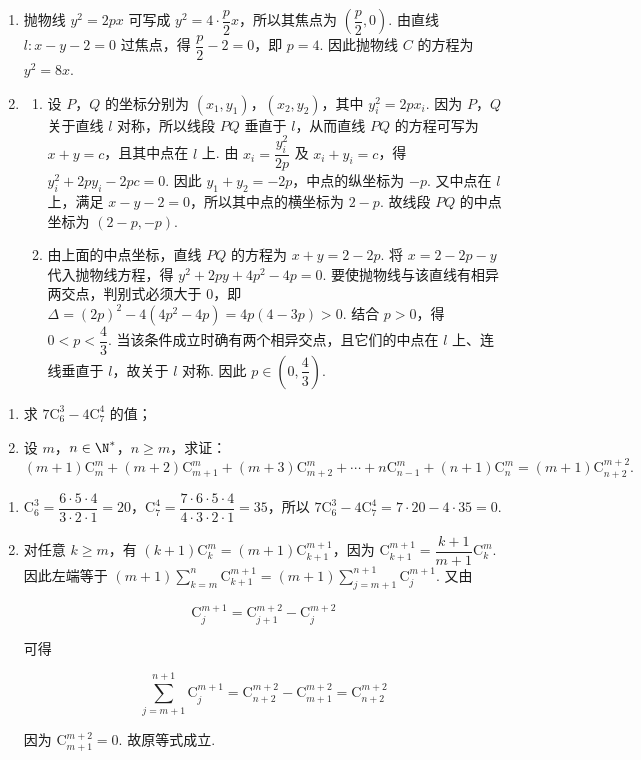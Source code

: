 \begin{solution}
\begin{enumerate}
\item 抛物线 \(y^2=2px\) 可写成 \(y^2=4\cdot\dfrac p2x\)，所以其焦点为 \(\left(\dfrac p2,0\right)\). 由直线 \(l:x-y-2=0\) 过焦点，得 \(\dfrac p2-2=0\)，即 \(p=4\). 因此抛物线 \(C\) 的方程为 \(y^2=8x\).
\item
\begin{enumerate}
\item 设 \(P\)，\(Q\) 的坐标分别为 \((x_1,y_1)\)，\((x_2,y_2)\)，其中 \(y_i^2=2px_i\). 因为 \(P\)，\(Q\) 关于直线 \(l\) 对称，所以线段 \(PQ\) 垂直于 \(l\)，从而直线 \(PQ\) 的方程可写为 \(x+y=c\)，且其中点在 \(l\) 上. 由 \(x_i=\dfrac{y_i^2}{2p}\) 及 \(x_i+y_i=c\)，得 \(y_i^2+2py_i-2pc=0\). 因此 \(y_1+y_2=-2p\)，中点的纵坐标为 \(-p\). 又中点在 \(l\) 上，满足 \(x-y-2=0\)，所以其中点的横坐标为 \(2-p\). 故线段 \(PQ\) 的中点坐标为 \((2-p,-p)\).
\item 由上面的中点坐标，直线 \(PQ\) 的方程为 \(x+y=2-2p\). 将 \(x=2-2p-y\) 代入抛物线方程，得 \(y^2+2py+4p^2-4p=0\). 要使抛物线与该直线有相异两交点，判别式必须大于 \(0\)，即 \(\Delta=(2p)^2-4(4p^2-4p)=4p(4-3p)>0\). 结合 \(p>0\)，得 \(0<p<\dfrac43\). 当该条件成立时确有两个相异交点，且它们的中点在 \(l\) 上、连线垂直于 \(l\)，故关于 \(l\) 对称. 因此 \(p\in\left(0,\dfrac43\right)\).
\end{enumerate}
\end{enumerate}
\end{solution}

\begin{problem}
\begin{enumerate}
\item 求 \(7\mathrm C_6^3-4\mathrm C_7^4\) 的值；
\item 设 \(m\)，\(n\in\N^*\)，\(n\ge m\)，求证：
\(
(m+1)\mathrm C_m^m+(m+2)\mathrm C_{m+1}^m+(m+3)\mathrm C_{m+2}^m+\cdots+n\mathrm C_{n-1}^m+(n+1)\mathrm C_n^m=(m+1)\mathrm C_{n+2}^{m+2}.
\)
\end{enumerate}
\end{problem}

\begin{solution}
\begin{enumerate}
\item \(\mathrm C_6^3=\dfrac{6\cdot5\cdot4}{3\cdot2\cdot1}=20\)，\(\mathrm C_7^4=\dfrac{7\cdot6\cdot5\cdot4}{4\cdot3\cdot2\cdot1}=35\)，所以 \(7\mathrm C_6^3-4\mathrm C_7^4=7\cdot20-4\cdot35=0\).
\item 对任意 \(k\ge m\)，有 \((k+1)\mathrm C_k^m=(m+1)\mathrm C_{k+1}^{m+1}\)，因为 \(\mathrm C_{k+1}^{m+1}=\dfrac{k+1}{m+1}\mathrm C_k^m\). 因此左端等于 \((m+1)\displaystyle\sum_{k=m}^{n}\mathrm C_{k+1}^{m+1}=(m+1)\displaystyle\sum_{j=m+1}^{n+1}\mathrm C_j^{m+1}\). 又由

\[
\mathrm C_j^{m+1}=\mathrm C_{j+1}^{m+2}-\mathrm C_j^{m+2}
\]

可得

\[
\displaystyle\sum_{j=m+1}^{n+1}\mathrm C_j^{m+1}=\mathrm C_{n+2}^{m+2}-\mathrm C_{m+1}^{m+2}=\mathrm C_{n+2}^{m+2}
\]

因为 \(\mathrm C_{m+1}^{m+2}=0\). 故原等式成立.
\end{enumerate}
\end{solution}
